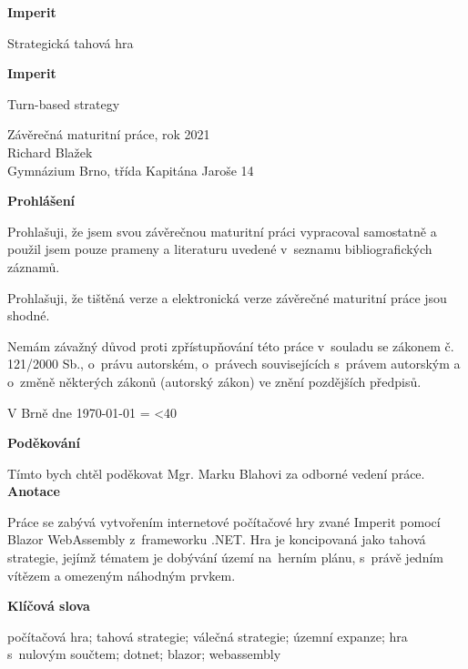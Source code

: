 \documentclass[a4paper,12pt]{article}
\author{Richard Blažek}
\makeatletter
\newcommand{\repeatchar}[2]{%
  \begingroup
  \my@repeat@count=\z@
  \@whilenum\my@repeat@count<#1\do{#2\advance\my@repeat@count\@ne}%
  \endgroup
}
\makeatother
\begin{document}
\begin{titlepage}
    \begin{center}

	\vspace*{3cm}            
	\Huge
	\textbf{Imperit}
            
	\vspace{0.5cm}
	\LARGE
	Strategická tahová hra
        
	\vspace*{1cm}
	\Huge
	\textbf{Imperit}
            
	\vspace{0.5cm}
	\LARGE
	Turn-based strategy
            
	\vfill
            
	\large
        Závěrečná maturitní práce, rok 2021\\
	Richard Blažek\\
	Gymnázium Brno, třída Kapitána Jaroše 14
    \end{center}
\end{titlepage}
\thispagestyle{empty}
\Large\textbf{Prohlášení}\normalsize

Prohlašuji, že jsem svou závěrečnou maturitní práci vypracoval samostatně a použil jsem pouze prameny a literaturu uvedené v~seznamu bibliografických záznamů.

Prohlašuji, že tištěná verze a elektronická verze závěrečné maturitní práce jsou shodné.

Nemám závažný důvod proti zpřístupňování této práce v~souladu se zákonem č. 121/2000 Sb., o~právu autorském, o~právech souvisejících s~právem autorským a o~změně některých zákonů (autorský zákon) ve znění pozdějších předpisů. 

V Brně dne \today{} \repeatchar{40}{.}
\newpage
\thispagestyle{empty}
\Large\textbf{Poděkování}\normalsize

Tímto bych chtěl poděkovat Mgr. Marku Blahovi za odborné vedení práce.
\newpage
\thispagestyle{empty}
\Large\textbf{Anotace}\normalsize

Práce se zabývá vytvořením internetové počítačové hry zvané Imperit pomocí Blazor WebAssembly z~frameworku .NET. Hra je koncipovaná jako tahová strategie, jejímž tématem je dobývání území na~herním plánu, s~právě jedním vítězem a omezeným náhodným prvkem.

\Large\textbf{Klíčová slova}\normalsize

počítačová hra; tahová strategie; válečná strategie; územní expanze; hra s~nulovým součtem;\- dotnet; blazor; webassembly
\end{document}
